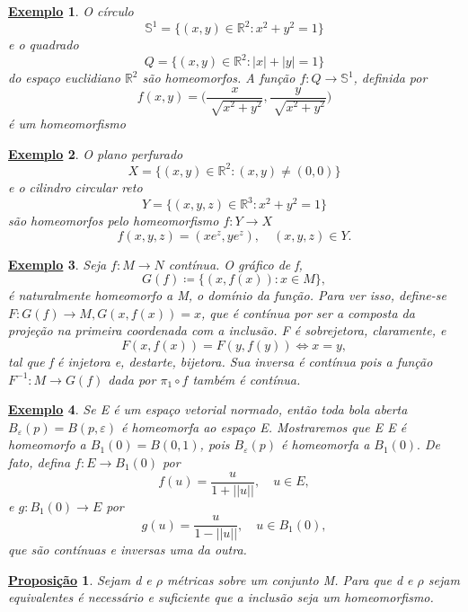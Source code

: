 \documentclass{article}
\newtheorem*{prop*}{\underline{Proposi\c c\~ao}}
\newtheorem{example}{\underline{Exemplo}}
\begin{document}
\begin{example}
  O círculo 
    \[
      \mathbb{S}^{1}=\{(x, y)\in \mathbb{R}^{2}: x^{2}+y^{2}=1\}
    \]
  e o quadrado 
    \[
      Q = \{(x, y)\in \mathbb{R}^{2}: |x|+|y|=1\}
    \]
  do espaço euclidiano \(\mathbb{R}^{2}\) são homeomorfos. A função \(f:Q\rightarrow \mathbb{S}^{1}\),
definida por 
  \[
    f(x, y) = \biggl(\frac{x}{\sqrt[]{x^{2}+y^{2}}}, \frac{y}{\sqrt[]{x^{2}+y^{2}}}\biggr)
  \]
  é um homeomorfismo
\end{example}
\begin{example}
  O plano perfurado 
  \[
    X = \{(x, y)\in \mathbb{R}^{2}: (x, y)\neq(0, 0)\}
  \]
e o cilindro circular reto 
  \[
    Y = \{(x, y, z)\in \mathbb{R}^{3}: x^{2}+y^{2}=1\}
  \]
são homeomorfos pelo homeomorfismo \(f:Y\rightarrow X\)
  \[
    f(x, y, z) = (x e^{z}, y e^{z}),\quad (x, y, z)\in Y.
  \]
\end{example}
\begin{example}
  Seja \(f:M\rightarrow N\) contínua. O gráfico de f, 
    \[
      G(f)\coloneqq \{(x, f(x)): x\in M\},
    \]
  é naturalmente homeomorfo a M, o domínio da função. Para ver isso, define-se
\(F:G(f)\rightarrow M, G(x, f(x))=x\), que é contínua por ser a composta da projeção na primeira coordenada com a inclusão.
F é sobrejetora, claramente, e 
  \[
    F(x, f(x)) = F(y, f(y)) \Longleftrightarrow x = y,
  \]
tal que f é injetora e, destarte, bijetora. Sua inversa é contínua pois a função
 \(F^{-1}:M\rightarrow G(f)\) dada por \(\pi_{1}\circ{f}\) também é contínua.
\end{example}
\begin{example}
  Se E é um espaço vetorial normado, então toda bola aberta \(B_{\varepsilon }(p) = B(p, \varepsilon )\)
é homeomorfa ao espaço E. Mostraremos que E E é homeomorfo a \(B_{1}(0) = B(0, 1)\), pois \(B_{\varepsilon }(p)\)
é homeomorfa a \(B_{1}(0).\) De fato, defina \(f:E\rightarrow B_{1}(0)\) por 
  \[
    f(u) = \frac{u}{1+||u||},\quad u\in E,
  \]
e \(g:B_{1}(0)\rightarrow E\) por 
  \[
    g(u) = \frac{u}{1-||u||},\quad u\in B_{1}(0),
  \]
que são contínuas e inversas uma da outra.
\end{example}
\begin{prop*}
  Sejam d e \(\rho \) métricas sobre um conjunto M. Para que d e \(\rho \) sejam equivalentes é
necessário e suficiente que a inclusão seja um homeomorfismo.
\end{prop*}
\end{document}
